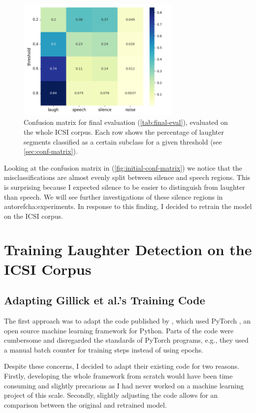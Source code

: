 \documentclass[bsc,frontabs,parskip,deptreport]{infthesis}
\newcommand{\confmatrixcaption}{Each row shows the percentage of laughter segments classified as a certain subclass for a given threshold (see \autoref{sec:conf-matrix}). }
\begin{document}
\begin{figure}[h!]
    \centering
    \includegraphics[width=8cm]{imgs/conf_matrix/init_eval_all.png}
    \caption{Confusion matrix for final evaluation (\autoref{tab:final-eval}), evaluated on the whole ICSI corpus. \confmatrixcaption}
    \label{fig:initial-conf-matrix}
\end{figure}

Looking at the confusion matrix in (\autoref{fig:initial-conf-matrix}) we notice that the misclassifications are almost evenly split between silence and speech regions. This is surprising because I expected silence to be easier to distinguish from laughter than speech.
We will see further investigations of these silence regions in autoref{cha:experiments}.
In response to this finding, I decided to retrain the model on the ICSI corpus. 


\chapter{Training Laughter Detection on the ICSI Corpus} \label{cha:retraining}
\section{Adapting Gillick et al.'s Training Code} \label{sec:adapting-gillick-training}
The first approach was to adapt the code published by \citet{gillick-codebase}, which used PyTorch \citep{pytorch2017automatic}, an open source machine learning framework for Python.
Parts of the code were cumbersome and disregarded the standards of PyTorch programs, e.g., they used a manual batch counter for training steps instead of using epochs.  

Despite these concerns, I decided to adapt their existing code for two reasons.
Firstly, developing the whole framework from scratch would have been time consuming and slightly precarious as I had never worked on a machine learning project of this scale.
Secondly, slightly adjusting the code allows for an comparison between the original and retrained model. 
\end{document}
